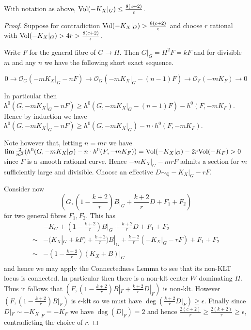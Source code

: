 \begin{lemma}\cite[Lemma 6.5]{jiang2014boundedness}
	With notation as above, $\text{Vol}(-K_{X}|_{G}) \leq \frac{8(c+2)}{\epsilon}$. 
\end{lemma}
\begin{proof}
	Suppose for contradiction $\text{Vol}(-K_{X}|_{G}) >\frac{8(c+2)}{\epsilon}$ and choose $r$ rational with $\text{Vol}(-K_{X}|_{G}) > 4r >\frac{8(c+2)}{\epsilon}$.
	
	Write $F$ for the general fibre of $G \to H$. Then $G|_{G}=H^{2}F=kF$ and for divisible $m$ and any $n$ we have the following short exact sequence.
	
	\[0 \to \mathcal{O}_{G}(-mK_{X}|_{G}-nF) \to \mathcal{O}_{G}(-mK_{X}|_{G}-(n-1)F) \to \mathcal{O}_{F}(-mK_{F}) \to 0\]
	
	In particular then $h^{0}(G,-mK_{X}|_{G}-nF) \geq h^{0}(G,-mK_{X}|_{G}-(n-1)F)-h^{0}(F,-mK_{F})$.
	Hence by induction we have $h^{0}(G,-mK_{X}|_{G}-nF) \geq h^{0}(G,-mK_{X}|_{G})-n\cdot h^{0}(F,-mK_{F})$.
	
	Note however that, letting $n=mr$ we have $\lim \frac{2}{m^{2}}(h^{0}(G,-mK_{X}|_{G})-n\cdot h^{0}(F,-mK_{F}))= \text{Vol}(-K_{X}|_{G})-2r\text{Vol}(-K_{F}) > 0$ since $F$ is a smooth rational curve. Hence $-mK_{X}|_{G}-mrF$ admits a section for $m$ sufficiently large and divisible. Choose an effective $D\sim_{\mathbb{Q}} -K_{X}|_{G}-rF$.
	
	Consider now \[(G,(1-\frac{k+2}{r})B|_{G}+\frac{k+2}{r}D+F_{1}+F_{2})\]
	 for two general fibres $F_{1}, F_{2}$.
	This has \begin{align*}
	&-K_{G}+(1-\frac{k+2}{r})B|_{G}+\frac{k+2}{r}D+F_{1}+F_{2}	\\
	\sim & -(K_{X}|_{G}+kF)+\frac{k+2}{r})B|_{G}+\frac{k+2}{r}(-K_{X}|_{G}-rF)+F_{1}+F_{2} \\	
	\sim & -(1-\frac{k+2}{r})(K_{X}+B)|_{G} \\
	\end{align*}
	and hence we may apply the Connectedness Lemma to see that its non-KLT locus is connected. In particular then there is a non-klt center $W$ dominating $H$. Thus it follows that $(F,(1-\frac{k+2}{r})B|_{F}+\frac{k+2}{r}D|_{F})$ is non-klt. However $(F,(1-\frac{k+2}{r})B|_{F})$ is $\epsilon$-klt so we must have $\deg (\frac{k+2}{r}D|_{F})\geq \epsilon$. Finally since $D|_{F}\sim -K_{X}|_{F}=-K_{F}$ we have $\deg(D|_{F})=2$ and hence $\frac{2(c+2)}{r} \geq \frac{2(k+2)}{r} \geq \epsilon$, contradicting the choice of $r$.
\end{proof}


